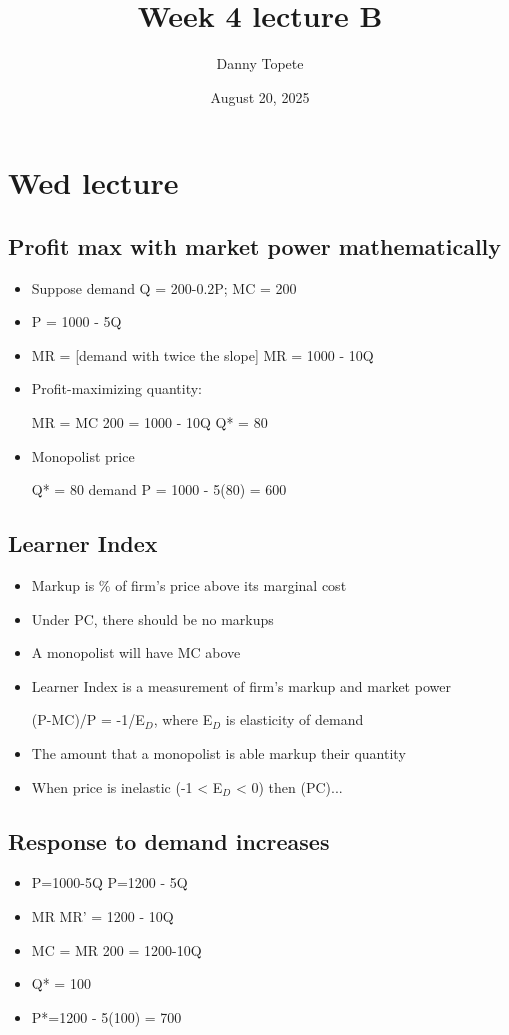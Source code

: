 \documentclass{article}
\title{Week 4 lecture B}
\author{Danny Topete}
\date{August 20, 2025}
\begin{document}
\maketitle

\section{Wed lecture}

\subsection{Profit max with market power mathematically}
\begin{itemize}
  \item Suppose demand Q = 200-0.2P; MC = 200
  \item P = 1000 - 5Q
  \item MR = [demand with twice the slope] \rightarrow{} MR = 1000 - 10Q
  \item Profit-maximizing quantity:

    MR = MC \rightarrow{} 200 = 1000 - 10Q \rightarrow{} Q* = 80
  \item Monopolist price

    Q* = 80 \rightarrow{} demand \rightarrow{} P = 1000 - 5(80) = 600
\end{itemize}

\subsection{Learner Index}
\begin{itemize}
  \item Markup is \% of firm's price above its marginal cost
  \item Under PC, there should be no markups
  \item A monopolist will have MC above
  \item Learner Index is a measurement of firm's markup and market power

    (P-MC)/P = -1/E$_D$, where E$_D$ is elasticity of demand
  \item The amount that a monopolist is able markup their quantity
  \item When price is inelastic (-1 < E$_D$ < 0) then (PC)...
\end{itemize}

\subsection{Response to demand increases}
\begin{itemize}
  \item P=1000-5Q \rightarrow{} P=1200 - 5Q
  \item MR \rightarrow{} MR' = 1200 - 10Q
  \item MC = MR \rightarrow{} 200 = 1200-10Q
  \item Q* = 100
  \item P*=1200 - 5(100) = 700
\end{itemize}
\end{document}
